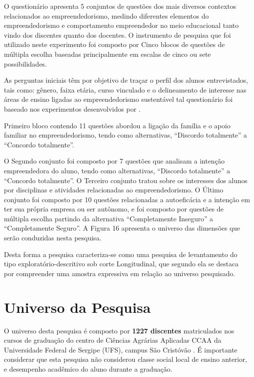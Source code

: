 O questionário apresenta 5 conjuntos de questões dos mais diversos contextos relacionados ao empreendedorismo, medindo diferentes elementos do empreendedorismo e comportamento empreendedor no meio educacional tanto vindo dos discentes quanto dos docentes. O instrumento de pesquisa que foi utilizado neste experimento foi composto por Cinco blocos de questões de múltipla escolha baseadas principalmente em escalas de cinco ou sete possibilidades.

As perguntas iniciais têm por objetivo de traçar o perfil dos alunos entrevistados, tais como: gênero, faixa etária, curso vinculado e o delineamento de interesse nas áreas de ensino ligadas ao empreendedorismo sustentável tal questionário foi baseado nos experimentos desenvolvidos por .

Primeiro bloco contendo 11 questões abordou a ligação da família e o apoio familiar no empreendedorismo, tendo como alternativas, “Discordo totalmente” a “Concordo totalmente”.

O Segundo conjunto foi composto por 7 questões que analisam a intenção empreendedora do aluno, tendo como alternativas, “Discordo totalmente” a “Concordo totalmente”.
O Terceiro conjunto tratou sobre os interesses dos alunos por disciplinas e atividades relacionadas ao empreendedorismo.
O Último conjunto foi composto por 10 questões relacionadas a autoeficácia e a intenção em ter sua própria empresa ou ser autônomo, e foi composto por questões de múltipla escolha partindo da alternativa “Completamente Inseguro” a “Completamente Seguro”. A Figura 16 apresenta o universo das dimensões que serão conduzidas nesta pesquisa.


Desta forma a pesquisa caracteriza-se como uma pesquisa de levantamento do tipo exploratório-descritivo sob corte Longitudinal, que segundo  ela se destaca por compreender uma amostra expressiva em relação ao universo pesquisado.

\section{Universo da Pesquisa}

O universo desta pesquisa é composto por \textbf{1227 discentes} matriculados nos cursos de graduação do centro de Ciências Agrárias Aplicadas CCAA da Universidade Federal de Sergipe (UFS), campus São Cristóvão \cite{andrade_ufs_2019}. É importante considerar que esta pesquisa não considerou classe social local de ensino anterior, e desempenho acadêmico do aluno durante a graduação.


